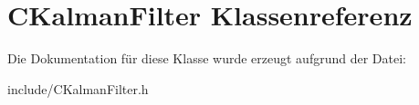 \hypertarget{class_c_kalman_filter}{\section{\-C\-Kalman\-Filter \-Klassenreferenz}
\label{class_c_kalman_filter}
}


\-Die \-Dokumentation für diese \-Klasse wurde erzeugt aufgrund der \-Datei\-:\begin{DoxyCompactItemize}
\item 
include/\-C\-Kalman\-Filter.\-h\end{DoxyCompactItemize}
